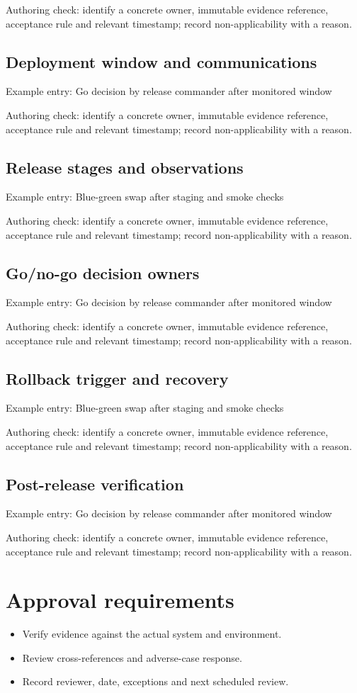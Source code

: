 \documentclass[10pt,letterpaper]{article}
\begin{document}
Authoring check: identify a concrete owner, immutable evidence reference, acceptance rule and relevant timestamp; record non-applicability with a reason.


\subsection{Deployment window and communications}
Example entry: Go decision by release commander after monitored window

Authoring check: identify a concrete owner, immutable evidence reference, acceptance rule and relevant timestamp; record non-applicability with a reason.


\subsection{Release stages and observations}
Example entry: Blue-green swap after staging and smoke checks

Authoring check: identify a concrete owner, immutable evidence reference, acceptance rule and relevant timestamp; record non-applicability with a reason.


\subsection{Go/no-go decision owners}
Example entry: Go decision by release commander after monitored window

Authoring check: identify a concrete owner, immutable evidence reference, acceptance rule and relevant timestamp; record non-applicability with a reason.


\subsection{Rollback trigger and recovery}
Example entry: Blue-green swap after staging and smoke checks

Authoring check: identify a concrete owner, immutable evidence reference, acceptance rule and relevant timestamp; record non-applicability with a reason.


\subsection{Post-release verification}
Example entry: Go decision by release commander after monitored window

Authoring check: identify a concrete owner, immutable evidence reference, acceptance rule and relevant timestamp; record non-applicability with a reason.


\section{Approval requirements}
\begin{itemize}
\item Verify evidence against the actual system and environment.
\item Review cross-references and adverse-case response.
\item Record reviewer, date, exceptions and next scheduled review.
\end{itemize}
\end{document}
